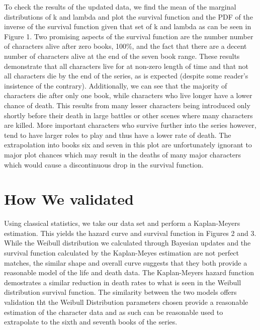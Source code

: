 \documentclass{article}
\begin{document}
To check the results of the updated data, we find the mean of the marginal distributions of k and lambda and plot the survival function and the PDF of the inverse of the survival function given that set of k and lambda as can be seen in Figure 1. Two promising aspects of the survival function are the number number of characters alive after zero books, 100\%, and the fact that there are a decent number of characters alive at the end of the seven book range. These results demonstrate that all characters live for at non-zero length of time and that not all characters die by the end of the series, as is expected (despite some reader's insistence of the contrary). Additionally, we can see that the majority of characters die after only one book, while characters who live longer have a lower chance of death. This results from many lesser characters being introduced only shortly before their death in large battles or other scenes where many characters are killed. More important characters who survive further into the series however, tend to have larger roles to play and thus have a lower rate of death. The extrapolation into books six and seven in this plot are unfortunately ignorant to major plot chances which may result in the deaths of many major characters which would cause a discontinuous drop in the survival function.

  
\section{How We validated}
Using classical statistics, we take our data set and perform a Kaplan-Meyers estimation. This yields the hazard curve and survival function in Figures 2 and 3. While the Weibull distribution we calculated through Bayesian updates and the survival function calculated by the Kaplan-Meyes estimation are not perfect matches, the similar shape and overall curve suggests that they both provide a reasonable model of the life and death data. The Kaplan-Meyers hazard function demostrates a similar reduction in death rates to what is seen in the Weibull distribution survival function. The similarity between the two models offers validation tht the Weibull Distribution parameters chosen provide a reasonable estimation of the character data and as such can be reasonable used to extrapolate to the sixth and seventh books of the series. 
\end{document}
